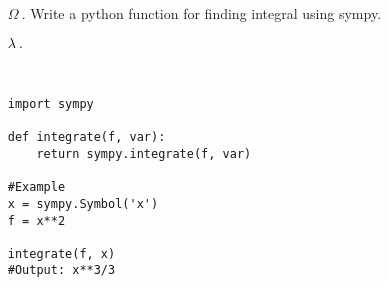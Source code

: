 \documentclass{article}
\begin{document}
\ttfamily
\sloppy
\vspace*{\fill}
\begin{itemize}
	\item[\textcolor{REDD}{$\Omega ~.$}]\textcolor{REDD}{Write a python function for finding integral using sympy.}

	\item[\textcolor{black}{$\lambda ~.$}]
\begin{verbatim}


import sympy

def integrate(f, var):
    return sympy.integrate(f, var)

#Example
x = sympy.Symbol('x')
f = x**2

integrate(f, x)
#Output: x**3/3
\end{verbatim}
\end{itemize}
\vspace*{\fill}
\end{document}
